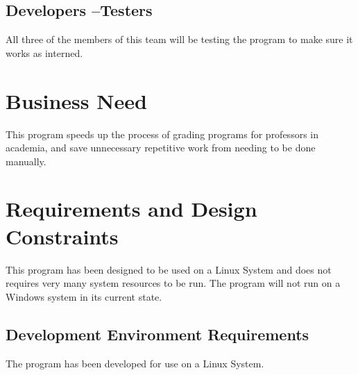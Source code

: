 \subsection{Developers --Testers}
All three of the members of this team will be testing the program to make sure it works as interned.



\section{Business Need}
This program speeds up the process of grading programs for professors in academia, and save unnecessary repetitive work from needing to be done manually. 


\section{Requirements and Design Constraints}
This program has been designed to be used on a Linux System and does not requires very many system resources to be run. The program will not run on a Windows system in its current state.






\subsection{Development Environment Requirements}
The program has been developed for use on a Linux System.


